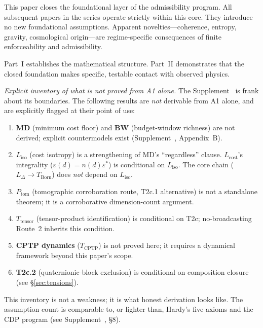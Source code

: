 \documentclass[11pt]{article}
\begin{document}
This paper closes the foundational layer of the admissibility program.  All subsequent papers in the series operate strictly within this core.  They introduce no new foundational assumptions.  Apparent novelties---coherence, entropy, gravity, cosmological origin---are regime-specific consequences of finite enforceability and admissibility.

Part~I establishes the mathematical structure.  Part~II demonstrates that the closed foundation makes specific, testable contact with observed physics.

\medskip
\noindent\textit{Explicit inventory of what is not proved from A1 alone.}  The Supplement~\cite{Supp} is frank about its boundaries.  The following results are \emph{not} derivable from A1 alone, and are explicitly flagged at their point of use:

\begin{enumerate}[nosep,label=(\roman*)]
\item \textbf{MD} (minimum cost floor) and \textbf{BW} (budget-window richness) are not derived; explicit countermodels exist (Supplement~\cite{Supp}, Appendix~B).
\item \textbf{$L_{\mathrm{iso}}$} (cost isotropy) is a strengthening of MD's ``regardless'' clause.  $L_{\mathrm{cost}}$'s integrality ($\varepsilon(d) = n(d)\varepsilon^*$) is conditional on $L_{\mathrm{iso}}$.  The core chain ($L_\Delta \to T_{\mathrm{Born}}$) does \emph{not} depend on $L_{\mathrm{iso}}$.
\item \textbf{$P_{\mathrm{tom}}$} (tomographic corroboration route, T2c.1 alternative) is not a standalone theorem; it is a corroborative dimension-count argument.
\item \textbf{$T_{\mathrm{tensor}}$} (tensor-product identification) is conditional on T2c; no-broadcasting Route~2 inherits this condition.
\item \textbf{CPTP dynamics} ($T_{\mathrm{CPTP}}$) is not proved here; it requires a dynamical framework beyond this paper's scope.
\item \textbf{T2c.2} (quaternionic-block exclusion) is conditional on composition closure (see §\ref{sec:tensions}).
\end{enumerate}

This inventory is not a weakness; it is what honest derivation looks like.  The assumption count is comparable to, or lighter than, Hardy's five axioms and the CDP program (see Supplement~\cite{Supp}, §8).


\end{document}
